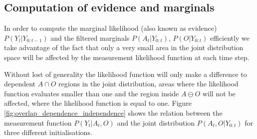 \subsection{Computation of evidence and marginals}

In order to compute the marginal likelihood (also known as evidence) $P(Y_t|Y_{0:t-1})$ and the filtered  marginals $P(A_t|Y_{0:t})$,
$P(O|Y_{0:t})$ efficiently we take advantage of the fact that only a very small area 
in the joint distribution space will be affected by the measurement likelihood function at each time step.

Without lost of generality the likelihood function will only make a difference to dependent $A \cap O$ regions in the joint distribution, areas 
where the likelihood function evaluates smaller than one and the region inside $A \ominus O$ will not be affected, where the likelihood function 
is equal to one.
Figure \ref{fig:overlap_dependence_independence} shows the relation between the measurement 
function $P(Y_t|A_t,O)$ and the joint distribution $P(A_t,O|Y_{0:t})$ for three different initialisations. 

%
 
